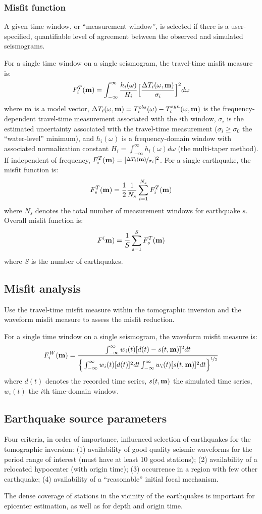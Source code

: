 \subsubsection{Misfit function}
A given time window, or ``measurement window'', is selected if there is a user-specified, quantifiable level of agreement between the observed and simulated seismograms.\par
For a single time window on a single seismogram, the travel-time misfit measure is:
\[ F_i^T(\mathbf{m})=\int_{-\infty}^\infty \frac{h_i(\omega)}{H_i}\Big[\frac{\Delta T_i(\omega,\mathbf{m})}{\sigma_i}\Big]^2d\omega \]
where $\mathbf{m}$ is a model vector, $\Delta T_i(\omega,\mathbf{m})=T_i^{obs}(\omega)-T_i^{syn}(\omega,\mathbf{m})$ is the frequency-dependent travel-time measurement associated with the $i$th window, $\sigma_i$ is the estimated uncertainty associated with the travel-time measurement ($\sigma_i\geqslant\sigma_0$ the ``water-level'' minimum), and $h_i(\omega)$ is a frequency-domain window with associated normalization constant $H_i=\int_{-\infty}^\infty h_i(\omega)d\omega$ (the multi-taper method). If independent of frequency, $F_i^T(\mathbf{m})=[\nicefrac{\Delta T_i(\mathbf{m})}{\sigma_i}]^2$. For a single earthquake, the misfit function is:
\[ F_s^T(\mathbf{m})=\frac{1}{2}\frac{1}{N_s}\sum_{i=1}^{N_s}F_i^T(\mathbf{m}) \]
where $N_s$ denotes the total number of measurement windows for earthquake $s$. Overall misfit function is:
\[ F^(\mathbf{m})=\frac{1}{S}\sum_{s=1}^SF_s^T(\mathbf{m}) \]
where $S$ is the number of earthquakes.\par
\subsection{Misfit analysis}
Use the travel-time misfit measure within the tomographic inversion and the waveform misfit measure to assess the misfit reduction.\par
For a single time window on a single seismogram, the waveform misfit measure is:
\[ F_i^W(\mathbf{m})=\frac{\int_{-\infty}^\infty w_i(t)[d(t)-s(t,\mathbf{m})]^2dt}{\Big\{\int_{-\infty}^\infty w_i(t)[d(t)]^2dt\int_{-\infty}^\infty w_i(t)[s(t,\mathbf{m})]^2dt\Big\}^{\nicefrac{1}{2}}} \]
where $d(t)$ denotes the recorded time series, $s(t,\mathbf{m})$ the simulated time series, $w_i(t)$ the $i$th time-domain window.\par
\subsection{Earthquake source parameters}
Four criteria, in order of importance, influenced selection of earthquakes for the tomographic inversion: (1) availability of good quality seismic waveforms for the period range of interest (must have at least 10 good stations); (2) availability of a relocated hypocenter (with origin time); (3) occurrence in a region with few other earthquake; (4) availability of a ``reasonable'' initial focal mechanism.\par
The dense coverage of stations in the vicinity of the earthquakes is important for epicenter estimation, as well as for depth and origin time.\par
